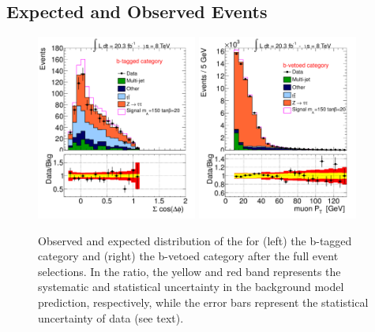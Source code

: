\subsection{Expected and Observed Events}
\begin{figure}[!t]
     \begin{center}
            \includegraphics[page=8, width=0.47\textwidth]{figure/final_plots/BTag_fulll.pdf}
            \includegraphics[page=11,width=0.47\textwidth]{figure/final_plots/Bveto_final.pdf}

    \end{center}
    \caption{ Observed and expected distribution of the \mmc for (left) the b-tagged  category and (right) the b-vetoed category after
        the full event selections. In the ratio, the yellow and red band represents the systematic and statistical uncertainty in the background model prediction, 
	respectively,  while the error bars represent the statistical uncertainty of data (see text).}
   \label{fig:mmc_categories}
\end{figure}

